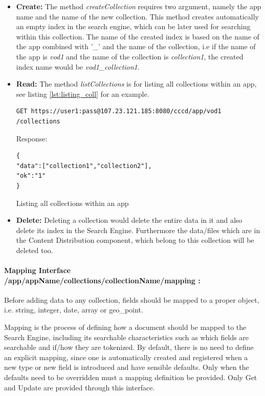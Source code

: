 \begin{itemize}
\item \textbf{Create:} The method \textit{createCollection} requires two argument, namely the app name and the name of the new collection. This method creates automatically an empty index in the search engine, which can be later used for searching within this collection. The name of the created index is based on the name of the app combined with '\_' and the name of the collection, i.e if the name of the app is \textit{vod1} and the name of the collection is \textit{collection1}, the created index name would be \textit{vod1\_collection1}.

\item \textbf{Read:} The method \textit{listCollections} is for listing all collections within an app, see listing \ref{lst:listing_coll} for an example.

\begin{code}
\begin{verbatim}
GET https://user1:pass@107.23.121.185:8080/cccd/app/vod1
/collections
\end{verbatim}
Response:
\begin{verbatim}
{
"data":["collection1","collection2"],
"ok":"1"
}
\end{verbatim}
\caption{Listing all collections within an app}
\label{lst:listing_coll}
\end{code}

\item \textbf{Delete:} Deleting a collection would delete the entire data in it and also delete its index in the Search Engine. Furthermore the data/files which are in the Content Distribution component, which belong to this collection will be deleted too.
\end{itemize}

\paragraph{Mapping Interface /app/{appName}/collections/{collectionName}/mapping :\label{sec:des_rest_api_mapping}} Before adding data to any collection, fields should be mapped to a proper object, i.e. string, integer, date, array or geo\_point. 

Mapping is the process of defining how a document should be mapped to the Search Engine, including its searchable characteristics such as which fields are searchable and if/how they are tokenized.  By default, there is no need to define an explicit mapping, since one is automatically created and registered when a new type or new field is introduced and have sensible defaults. Only when the defaults need to be overridden must a mapping definition be provided. Only Get and Update are provided through this interface.
 
